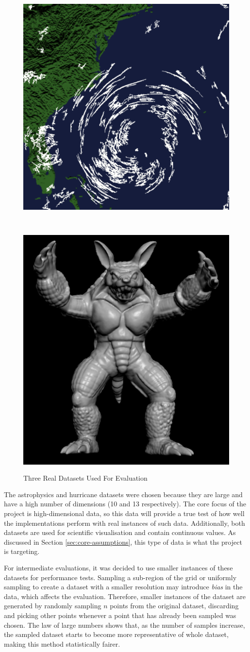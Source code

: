 \begin{figure}
\begin{center}
\begin{subfloat}{%
				\includegraphics[scale=0.25]{figures/hurricane_isabel.pdf}
			}
			\end{subfloat}~
			\begin{subfloat} {%
				\includegraphics[scale=0.15]{figures/armadillo.pdf}
			}
			\end{subfloat}			  
		\end{center}

		\caption{Three Real Datasets Used For Evaluation}
		\label{fig:real-data}
\end{figure}

The astrophysics and hurricane datasets were chosen because they are large and have a high number of dimensions (10 and 13 respectively). The core focus of the project is high-dimensional data, so this data will provide a true test of how well the implementations perform with real instances of such data. Additionally, both datasets are used for scientific visualisation and contain continuous values. As discussed in Section \ref{sec:core-assumptions}, this type of data is what ths project is targeting.

For intermediate evaluations, it was decided to use smaller instances of these datasets for performance tests. Sampling a sub-region of the grid or uniformly sampling to create a dataset with a smaller resolution may introduce \textit{bias} in the data, which affects the evaluation. Therefore, smaller instances of the dataset are generated by randomly sampling $n$ points from the original dataset, discarding and picking other points whenever a point that has already been sampled was chosen. The law of large numbers \cite{large-sample-theory} shows that, as the number of samples increase, the sampled dataset starts to become more representative of whole dataset, making this method statistically fairer.

